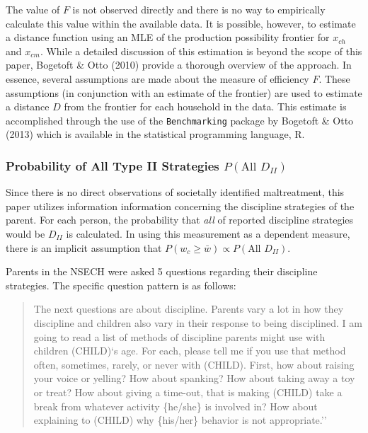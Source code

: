 \documentclass[review]{elsarticle}\usepackage[]{graphicx}\usepackage[]{color}
\begin{document}
The value of $F$ is not observed directly and there is no way to
empirically calculate this value within the available data. It is
possible, however, to estimate a distance function using an MLE of the
production possibility frontier for $x_{ch}$ and $x_{cm}$. While a
detailed discussion of this estimation is beyond the scope of this
paper, Bogetoft \& Otto (2010) provide a thorough overview of the
approach. In essence, several assumptions are made about the measure of
efficiency $F$. These assumptions (in conjunction with an estimate of
the frontier) are used to estimate a distance $D$ from the frontier for
each household in the data. This estimate is accomplished through the
use of the \texttt{Benchmarking} package by Bogetoft \& Otto (2013)
which is available in the statistical programming language, R.

\subsubsection{Probability of All Type II Strategies
$P(\text{All } D_{II})$}\label{probability-of-all-type-ii-strategies-ptextall-dux5fii}

Since there is no direct observations of societally identified
maltreatment, this paper utilizes information information concerning the
discipline strategies of the parent. For each person, the probability
that \emph{all} of reported discipline strategies would be $D_{II}$ is
calculated. In using this measurement as a dependent measure, there is
an implicit assumption that
$P(w_c \ge \bar{w}) \propto  P(\text{All } D_{II})$.

Parents in the NSECH were asked 5 questions regarding their discipline
strategies. The specific question pattern is as follows:

\begin{quote}
The next questions are about discipline. Parents vary a lot in how they
discipline and children also vary in their response to being
disciplined. I am going to read a list of methods of discipline parents
might use with children (CHILD)`s age. For each, please tell me if you
use that method often, sometimes, rarely, or never with (CHILD). First,
how about raising your voice or yelling? How about spanking? How about
taking away a toy or treat? How about giving a time-out, that is making
(CHILD) take a break from whatever activity \{he/she\} is involved in?
How about explaining to (CHILD) why \{his/her\} behavior is not
appropriate.''
\end{quote}
\end{document}
